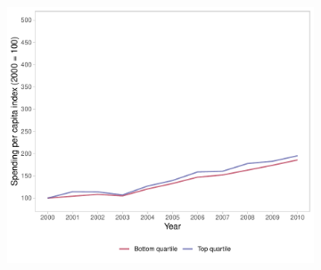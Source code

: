 \begin{figure}[h]
\begin{center}
\begin{subfigure}{0.45\textwidth}
        \includegraphics[width=\textwidth]{plots/plot_transf.pdf}
    \end{subfigure}
    \end{center}\vspace{+1pt}
\end{figure}

